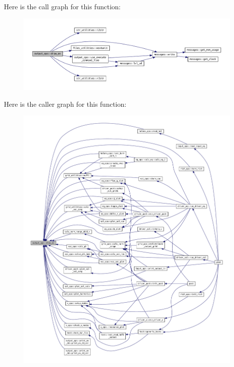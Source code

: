 Here is the call graph for this function\+:\nopagebreak
\begin{figure}[H]
\begin{center}
\leavevmode
\includegraphics[width=350pt]{namespaceoutput__ops_a50bfbb88cc91805469353c3ff47b3e2e_cgraph}
\end{center}
\end{figure}
Here is the caller graph for this function\+:
\nopagebreak
\begin{figure}[H]
\begin{center}
\leavevmode
\includegraphics[width=350pt]{namespaceoutput__ops_a50bfbb88cc91805469353c3ff47b3e2e_icgraph}
\end{center}
\end{figure}
\mbox{\label{namespaceoutput__ops_ab0d14194d01ab0534562eab50b37a57a}} 
